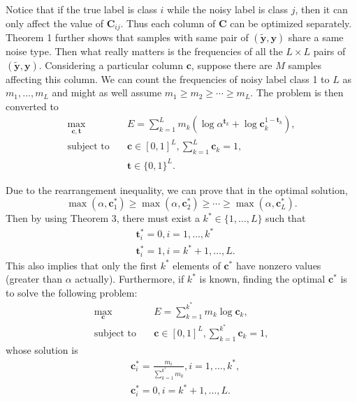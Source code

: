 \documentclass[10pt,twocolumn,letterpaper]{article}
\def\vec{\mathbf}
\def\mat{\mathbf}
\begin{document}
Notice that if the true label is class $i$ while the noisy label is class $j$, then it can only affect the value of $\mat{C}_{ij}$. Thus each column of $\mat{C}$ can be optimized separately. Theorem 1 further shows that samples with same pair of $(\tilde{\vec{y}},\vec{y})$ share a same noise type. Then what really matters is the frequencies of all the $L\times L$ pairs of $(\tilde{\vec{y}},\vec{y})$. Considering a particular column $\vec{c}$, suppose there are $M$ samples affecting this column. We can count the frequencies of noisy label class 1 to $L$ as $m_1,\dots,m_L$ and might as well assume $m_1\geq m_2\geq \cdots \geq m_L$. The problem is then converted to
\begin{equation}
\begin{aligned}
\max_{\vec{c},\vec{t}} \quad & E=\sum_{k=1}^{L} m_k \left(\log \alpha^{\vec{t}_k} + \log \mat{c}_k^{1-\vec{t}_k}\right),\\
\text{subject to} \quad & \vec{c} \in [0,1]^L, \sum_{k=1}^{L} \vec{c}_k = 1,\\
                    & \vec{t} \in \{0,1\}^{L}.
\end{aligned}
\end{equation}

Due to the rearrangement inequality, we can prove that in the optimal solution,
\begin{equation}
    \max(\alpha,\vec{c}^*_1) \geq \max(\alpha,\vec{c}^*_2) \geq \cdots \geq \max(\alpha,\vec{c}^*_L).
\end{equation}
Then by using Theorem 3, there must exist a $k^* \in \{1,\dots,L\}$ such that
\begin{equation} \label{eq:opt_t}
\begin{aligned}
    &\vec{t}^*_i = 0, i = 1,\dots,k^* \\
    &\vec{t}^*_i = 1, i = k^*+1,\dots,L.
\end{aligned}
\end{equation}
This also implies that only the first $k^*$ elements of $\vec{c}^*$ have nonzero values (greater than $\alpha$ actually). Furthermore, if $k^*$ is known, finding the optimal $\vec{c}^*$ is to solve the following problem:
\begin{equation}
\begin{aligned}
\max_{\vec{c}} \quad & E=\sum_{k=1}^{k^*} m_k \log \mat{c}_k,\\
\text{subject to} \quad & \vec{c} \in [0,1]^L, \sum_{k=1}^{k^*} \vec{c}_k = 1,
\end{aligned}
\end{equation}
whose solution is
\begin{equation} \label{eq:opt_c}
\begin{aligned}
    &\vec{c}^*_i = \frac{m_i}{\sum_{k=1}^{k^*}{m_k}}, i = 1,\dots,k^*,\\
    &\vec{c}^*_i = 0, i = k^*+1,\dots,L.
\end{aligned}
\end{equation}
\end{document}
